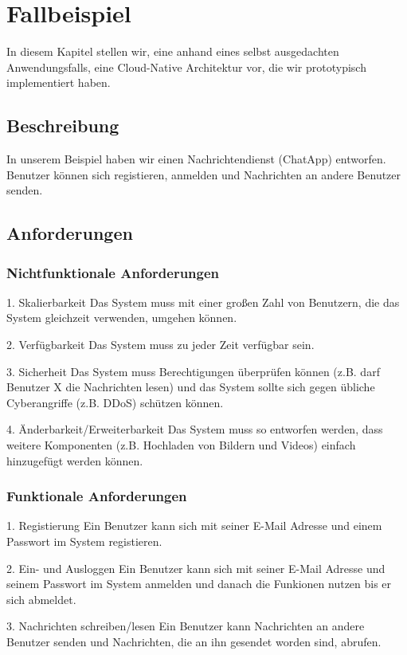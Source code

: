 \chapter{Fallbeispiel}
In diesem Kapitel stellen wir, eine anhand eines selbst ausgedachten Anwendungsfalls, eine Cloud-Native Architektur vor, die wir prototypisch implementiert haben.

\section{Beschreibung}
In unserem Beispiel haben wir einen Nachrichtendienst (ChatApp) entworfen. Benutzer können sich registieren, anmelden und Nachrichten an andere Benutzer senden. 


\section{Anforderungen}
\subsection{Nichtfunktionale Anforderungen}
1. Skalierbarkeit
Das System muss mit einer großen Zahl von Benutzern, die das System gleichzeit verwenden, umgehen können.

2. Verfügbarkeit
Das System muss zu jeder Zeit verfügbar sein.

3. Sicherheit
Das System muss Berechtigungen überprüfen können (z.B. darf Benutzer X die Nachrichten lesen) und das System sollte sich gegen übliche Cyberangriffe (z.B. DDoS) schützen können.

4. Änderbarkeit/Erweiterbarkeit
Das System muss so entworfen werden, dass weitere Komponenten (z.B. Hochladen von Bildern und Videos) einfach hinzugefügt werden können.

\subsection{Funktionale Anforderungen}
1. Registierung
Ein Benutzer kann sich mit seiner E-Mail Adresse und einem Passwort im System registieren.

2. Ein- und Ausloggen
Ein Benutzer kann sich mit seiner E-Mail Adresse und seinem Passwort im System anmelden und danach die Funkionen nutzen bis er sich abmeldet.

3. Nachrichten schreiben/lesen
Ein Benutzer kann Nachrichten an andere Benutzer senden und Nachrichten, die an ihn gesendet worden sind, abrufen.


